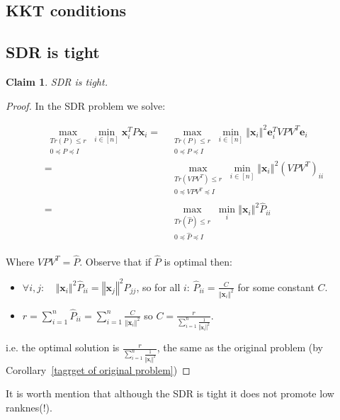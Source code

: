 \documentclass{article}
\newtheorem{claim}{Claim}
\newcommand{\cororef}[1]{Corollary~\ref{#1}}
\newcommand{\x}{{\mathbf x}}
\newcommand{\e}{{\mathbf e}}
\begin{document}
\subsection{KKT conditions}


\subsection{SDR is tight}

\begin{claim} \label{SDR is tight}
SDR is tight.
\end{claim}
\begin{proof}
    In the SDR problem we solve:
    
\begin{align*}
    \max_{\begin{array}{c}
    Tr\left(P\right)\le r\\
    0\preceq P\preceq I
    \end{array}}\min_{i\in[n]}\x_{i}^TP\x_{i}
    =&\max_{\begin{array}{c}
    Tr\left(P\right)\le r\\
    0\preceq P\preceq I
    \end{array}}\min_{i\in[n]}\left\Vert \x_{i}\right\Vert^{2}\e_{i}^TVPV^T\e_{i}\\
    =& \max_{\begin{array}{c}
    Tr\left(VPV^T\right)\le r\\
    0\preceq VPV^T\preceq I
    \end{array}}\min_{i\in[n]}\left\Vert \x_{i}\right\Vert^{2}(VPV^T)_{ii}\\
    =&\max_{\begin{array}{c}
    Tr\left(\hat{P}\right)\le r\\
    0\preceq \hat{P}\preceq I
    \end{array}}\min_{i}\left\Vert \x_{i}\right\Vert^{2}\hat{P}_{ii}
\end{align*}

Where $VPV^T=\hat{P}$. Observe that if $\hat{P}$ is optimal then:
\begin{itemize}
    \item $\forall i,j:\quad\left\Vert\x_{i}\right\Vert^{2}\hat{P}_{ii}=\left\Vert\x_{j}\right\Vert^{2}\hat{P}_{jj}$, so for all $i$: $\hat{P}_{ii}=\frac{C}{\left\Vert\x_{i}\right\Vert^{2}}$ for some constant $C$.
    \item $r=\sum_{i=1}^n \hat{P}_{ii}=\sum_{i=1}^n\frac{C}{\left\Vert\x_{i}\right\Vert^{2}}$ so $C=\frac{r}{\sum_{i=1}^n\frac{1}{\left\Vert\x_{i}\right\Vert^{2}}}$.
\end{itemize}
i.e. the optimal solution is $\frac{r}{\sum_{i=1}^n\frac{1}{\left\Vert\x_{i}\right\Vert^{2}}}$, the same as the original problem (by \cororef{tagrget of original problem}) 

\end{proof}
It is worth mention that although the SDR is tight it does not promote low ranknes(!).
\end{document}
